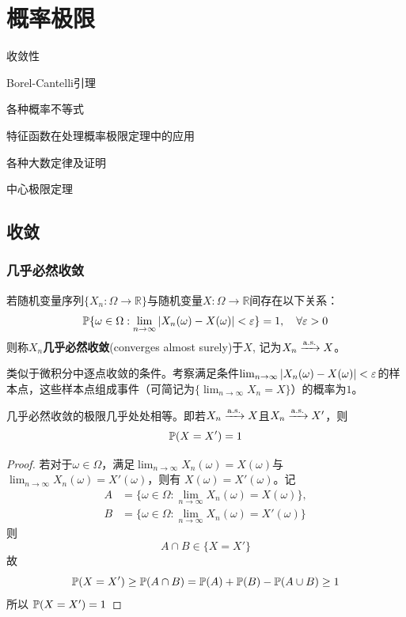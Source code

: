 \chapter{概率极限}\label{chap:limitation}
\begin{introduction}[考试重点]
    \item 收敛性
    \item Borel-Cantelli引理
    \item 各种概率不等式
    \item 特征函数在处理概率极限定理中的应用
    \item 各种大数定律及证明
    \item 中心极限定理
\end{introduction}
\section{收敛}

\subsection{几乎必然收敛}

\begin{definition}[几乎必然收敛]
    若随机变量序列$\{ X_n: \Omega \to \mathbb{R} \}$与随机变量$X:\Omega \to \mathbb{R}$间存在以下关系：
    \[ \P\{ \omega \in \Omega: \lim_{n \to \infty}\abs{ X_n(\omega) - X(\omega)} < \e \} =1,\quad \forall \e > 0\]
    则称$X_n$\textbf{几乎必然收敛}(converges almost surely)于$X$, 记为$X_n \xrightarrow{\as} X$。
\end{definition}
\begin{remark}
    类似于微积分中逐点收敛的条件。考察满足条件$\lim_{n \to \infty}\abs{ X_n(\omega) - X(\omega)} < \e$的样本点，这些样本点组成事件（可简记为$\{ \lim_{n \to \infty} X_n=X \}$）的概率为$1$。
\end{remark}

\begin{proposition}
    几乎必然收敛的极限几乎处处相等。即若$X_n \xrightarrow{\as} X$且$X_n \xrightarrow{\as} X'$，则 
    \[ \P(X=X')=1 \]
\end{proposition}
\begin{proof}
    若对于$\omega \in \Omega$，满足$\lim_{n \to \infty} X_n(\omega)=X(\omega)$与$\lim_{n \to \infty} X_n(\omega)=X'(\omega)$，则有 $X(\omega)=X'(\omega)$。记
    \begin{align*}
        A &= \{ \omega \in \Omega: \lim_{n \to \infty} X_n(\omega)=X(\omega) \}, \\
        B &= \{ \omega \in \Omega: \lim_{n \to \infty} X_n(\omega)=X'(\omega) \}
    \end{align*}
    则
    \[ A \cap B \in \{ X=X' \} \]
    故
    \[ \P(X=X') \ge \P(A \cap B) = \P(A) + \P(B) - \P(A \cup B) \ge 1 \]
    所以 $\P(X=X')=1$
\end{proof}

